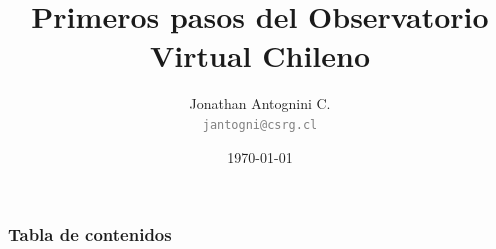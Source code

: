\documentclass[10pt]{beamer}
\title[Primeros Pasos Chivo]{Primeros pasos del Observatorio Virtual Chileno}
\author{Jonathan Antognini C. \\
        \small{\textcolor{gray}{\texttt{jantogni@csrg.cl}}}}
\institute[CSRG-UTFSM]{
Computer Systems Research Group,\\
Universidad Técnica Fedrico Santa María
}
\date{\today}
\begin{document}
\begin{frame}[t,plain]
\titlepage
\end{frame}


\begin{frame}
	\frametitle{Tabla de contenidos}
	\tableofcontents
\end{frame}


\newpage


\newpage


\newpage


\newpage


\newpage


\newpage

%
%


\begin{frame}[t,plain]
\titlepage
\end{frame}
\end{document}
